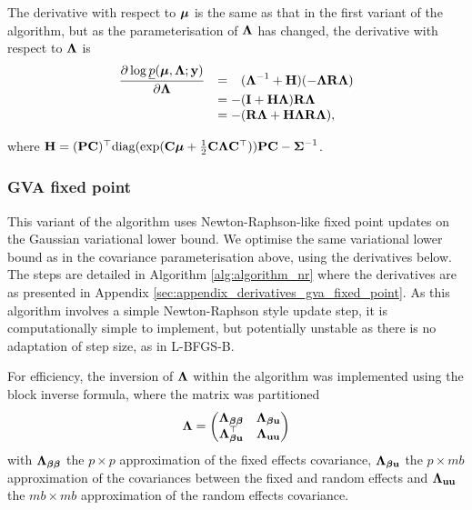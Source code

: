 \noindent The derivative with respect to ${\boldsymbol \mu}$ is the same as that in the
first variant of the algorithm, but as the parameterisation of ${\boldsymbol \Lambda}$ has
changed, the  derivative with respect to ${\boldsymbol \Lambda}$ is 
\begin{equation}
\label{eq:gva_lower_bound_precision_deriv}
\begin{array}{ll}
	\displaystyle \frac{\partial \log \underline{p}({\boldsymbol \mu}, {\boldsymbol \Lambda}; {\bf y})}{\partial {\boldsymbol\Lambda}}
	  & = \hphantom{-}({\boldsymbol \Lambda}^{-1} + {\bf H})(-{\boldsymbol \Lambda} {\bf R} {\boldsymbol \Lambda}) \\
	  & = -({\bf I} + {\bf H}{\boldsymbol \Lambda}){\bf R}{\boldsymbol \Lambda} \\
	  & = - ({\bf R}{\boldsymbol \Lambda} + {\bf H}{\boldsymbol \Lambda}{\bf R}{\boldsymbol \Lambda}),
\end{array}
\end{equation}
		
\noindent where ${\bf H} = ({\bf P} {\bf C})^\top \text{diag}(\exp({\bf C} {\boldsymbol \mu} + \frac{1}{2}
{\bf C} {\boldsymbol \Lambda} {\bf C}^\top)) {\bf P} {\bf C} - {\boldsymbol \Sigma}^{-1}$.
		
\subsubsection{GVA fixed point} 	%

This variant of the algorithm uses Newton-Raphson-like fixed point updates on
the Gaussian variational lower bound. We optimise the same variational lower
bound as in the covariance parameterisation above, using the derivatives below.
The steps are detailed in Algorithm \ref{alg:algorithm_nr} where the
derivatives are as presented in Appendix
\ref{sec:appendix_derivatives_gva_fixed_point}. As this algorithm involves a
simple Newton-Raphson style update step, it is computationally simple to
implement, but potentially unstable as there is no adaptation of step size, as
in L-BFGS-B.

For efficiency, the inversion of ${\boldsymbol \Lambda}$ within the algorithm was
implemented using the block inverse formula, where	the matrix was partitioned
\[
	{\boldsymbol \Lambda} =
	\begin{pmatrix}
		{\boldsymbol\Lambda}_{{\boldsymbol \beta} {\boldsymbol \beta}} & {\boldsymbol \Lambda}_{{\boldsymbol \beta} {\bf u}} \\
		{\boldsymbol \Lambda}_{{\boldsymbol \beta} {\bf u}}^\top & {\boldsymbol \Lambda}_{{\bf u} {\bf u}}
	\end{pmatrix}
\]
with ${\boldsymbol \Lambda}_{{\boldsymbol \beta} {\boldsymbol \beta}}$ the $p \times p$ approximation of the fixed
effects covariance, ${\boldsymbol \Lambda}_{{\boldsymbol \beta} {\bf u}}$ the $p \times mb$ approximation
of the covariances between the fixed and random effects and ${\boldsymbol \Lambda}_{{\bf u}
{\bf u}}$ the $mb \times mb$ approximation of the random effects covariance.

